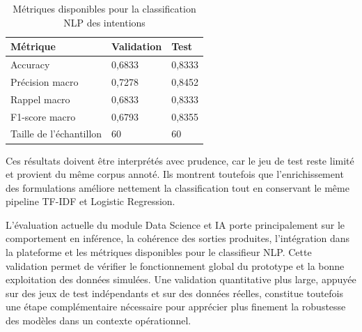 \begin{table}[H]
\centering
\small
\caption{Métriques disponibles pour la classification NLP des intentions}
\label{tab:metrics-nlp-intents}
\begin{tabular}{|p{}|p{}|p{}|}
\hline
\rowcolor{SectionColor!12}
\textbf{Métrique} & \textbf{Validation} & \textbf{Test} \\
\hline
Accuracy & 0,6833 & 0,8333 \\
\hline
Précision macro & 0,7278 & 0,8452 \\
\hline
Rappel macro & 0,6833 & 0,8333 \\
\hline
F1-score macro & 0,6793 & 0,8355 \\
\hline
Taille de l'échantillon & 60 & 60 \\
\hline
\end{tabular}
\end{table}

Ces résultats doivent être interprétés avec prudence, car le jeu de test reste limité et provient du même corpus annoté. Ils montrent toutefois que l'enrichissement des formulations améliore nettement la classification tout en conservant le même pipeline TF-IDF et Logistic Regression.

L'évaluation actuelle du module Data Science et IA porte principalement sur le comportement en inférence, la cohérence des sorties produites, l'intégration dans la plateforme et les métriques disponibles pour le classifieur NLP. Cette validation permet de vérifier le fonctionnement global du prototype et la bonne exploitation des données simulées. Une validation quantitative plus large, appuyée sur des jeux de test indépendants et sur des données réelles, constitue toutefois une étape complémentaire nécessaire pour apprécier plus finement la robustesse des modèles dans un contexte opérationnel.

